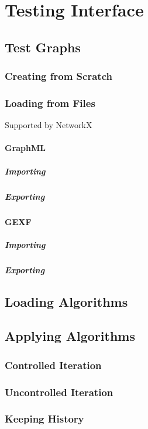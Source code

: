 \section{Testing Interface}
\label{sec:interface-testing}

\subsection{Test Graphs}
\subsubsection{Creating from Scratch}
\subsubsection{Loading from Files}
\label{sec:interface-testing:import}
Supported by NetworkX~\autocite{hagberg:networkx}
\paragraph{GraphML}
\subparagraph{Importing}
\subparagraph{Exporting}

\paragraph{GEXF}
\subparagraph{Importing}
\subparagraph{Exporting}

\subsection{Loading Algorithms} %
\subsection{Applying Algorithms}
\subsubsection{Controlled Iteration}
\subsubsection{Uncontrolled Iteration}
\subsubsection{Keeping History}

